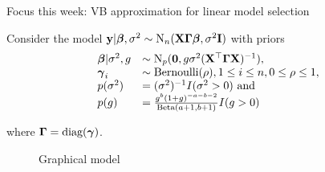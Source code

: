 \documentclass{beamer}
\begin{document}
\def\vGamma{{\boldsymbol{\Gamma}}}
\begin{frame}{Focus this week: VB approximation for linear model selection}

Consider the model $\vy | \vbeta, \sigma^2 \sim \text{N}_n(\mX \vGamma \vbeta, \sigma^2 \mI)$ 
with priors
\begin{equation*}
\begin{array}{ll}
\vbeta | \sigma^2, g &\sim \text{N}_p(\vzero, g \sigma^2(\mX^\top \vGamma \mX)^{-1}), \\
\vgamma_i &\sim \text{Bernoulli}(\rho), 1 \leq i \leq n, 0 \leq \rho \leq 1, \\
p(\sigma^2) &= (\sigma^2)^{-1} I(\sigma^2 > 0) \text{ and }\\
p(g) &= \frac{g^b (1 + g)^{-a - b - 2}}{\text{Beta}(a + 1, b + 1)} I(g > 0)
\end{array}
\end{equation*}

where $\vGamma = \diag (\vgamma)$.

\begin{figure}
\caption{Graphical model}
\end{figure}
\end{frame}
\end{document}
